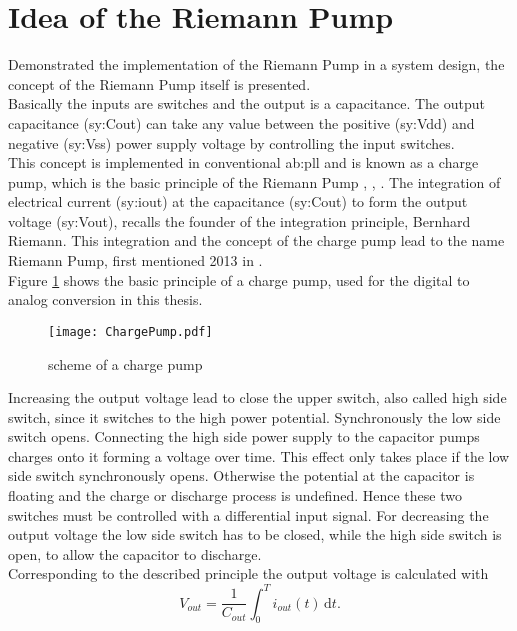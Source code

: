 \section{Idea of the Riemann Pump}
\label{IdeaRiemannPump}
Demonstrated the implementation of the Riemann Pump in a system design, the concept of the Riemann Pump itself is presented.\\
Basically the inputs are switches and the output is a capacitance.
The output capacitance (\gls{sy:Cout}) can take any value between the positive (\gls{sy:Vdd}) and negative (\gls{sy:Vss}) power supply voltage by controlling the input switches.\\
This concept is implemented in conventional \gls{ab:pll} and is known as a charge pump, which is the basic principle of the Riemann Pump \cite{DevalRivetVeyracEtAl2013}, \cite{VeyracRivetDevalEtAl2014}, \cite{DevalRivetVeyrac2015}.
 The integration of electrical current (\gls{sy:iout}) at the capacitance (\gls{sy:Cout}) to form the output voltage  (\gls{sy:Vout}), recalls the founder of the integration principle, Bernhard Riemann.
This integration and the concept of the charge pump lead to the name Riemann Pump, first mentioned 2013 in \cite{DevalRivetVeyracEtAl2013}. \\
Figure \ref{fig:ChargePump} shows the basic principle of a charge pump, used for the digital to analog conversion in this thesis.

\begin{figure}[ht]
	\centering
  \texttt{[image: ChargePump.pdf]}
	\caption{scheme of a charge pump}
	\label{fig:ChargePump}
\end{figure}

Increasing the output voltage lead to close the upper switch, also called high side switch, since it switches to the high power potential.
Synchronously the low side switch opens.
Connecting the high side power supply to the capacitor pumps charges onto it forming a voltage over time.
This effect only takes place if the low side switch synchronously opens.
Otherwise the potential at the capacitor is floating and the charge or discharge process is undefined.
Hence these two switches must be controlled with a differential input signal.
For decreasing the output voltage the low side switch has to be closed, while the high side switch is open, to allow the capacitor to discharge.\\
Corresponding to the described principle the output voltage is calculated with 
\begin{equation}
	V_{out} = \frac{1}{C_{out}}{ \int_0^T \! i_{out}(t) \, \mathrm{d}t}.
\end{equation} %


